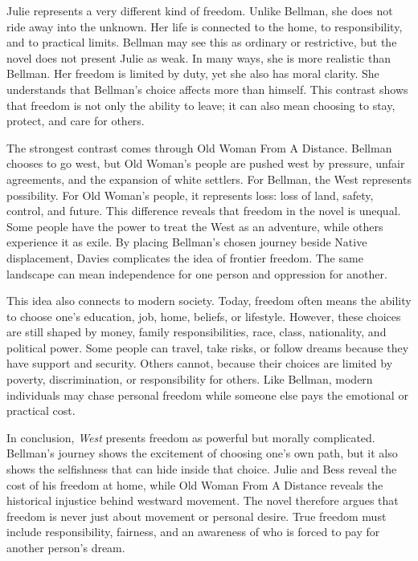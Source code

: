 \documentclass[11pt,a4paper]{article}
\begin{document}
Julie represents a very different kind of freedom. Unlike Bellman, she does not ride away into the unknown. Her life is connected to the home, to responsibility, and to practical limits. Bellman may see this as ordinary or restrictive, but the novel does not present Julie as weak. In many ways, she is more realistic than Bellman. Her freedom is limited by duty, yet she also has moral clarity. She understands that Bellman's choice affects more than himself. This contrast shows that freedom is not only the ability to leave; it can also mean choosing to stay, protect, and care for others.

The strongest contrast comes through Old Woman From A Distance. Bellman chooses to go west, but Old Woman's people are pushed west by pressure, unfair agreements, and the expansion of white settlers. For Bellman, the West represents possibility. For Old Woman's people, it represents loss: loss of land, safety, control, and future. This difference reveals that freedom in the novel is unequal. Some people have the power to treat the West as an adventure, while others experience it as exile. By placing Bellman's chosen journey beside Native displacement, Davies complicates the idea of frontier freedom. The same landscape can mean independence for one person and oppression for another.

This idea also connects to modern society. Today, freedom often means the ability to choose one's education, job, home, beliefs, or lifestyle. However, these choices are still shaped by money, family responsibilities, race, class, nationality, and political power. Some people can travel, take risks, or follow dreams because they have support and security. Others cannot, because their choices are limited by poverty, discrimination, or responsibility for others. Like Bellman, modern individuals may chase personal freedom while someone else pays the emotional or practical cost.

In conclusion, \textit{West} presents freedom as powerful but morally complicated. Bellman's journey shows the excitement of choosing one's own path, but it also shows the selfishness that can hide inside that choice. Julie and Bess reveal the cost of his freedom at home, while Old Woman From A Distance reveals the historical injustice behind westward movement. The novel therefore argues that freedom is never just about movement or personal desire. True freedom must include responsibility, fairness, and an awareness of who is forced to pay for another person's dream.
\end{document}
